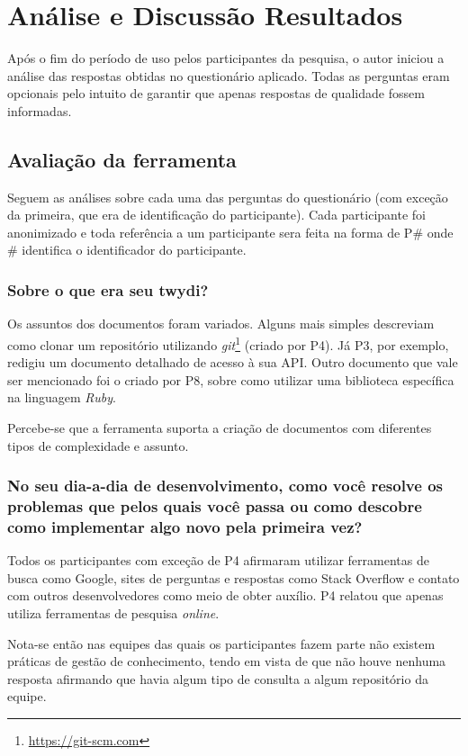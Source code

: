 \chapter{Análise e Discussão Resultados}

Após o fim do período de uso pelos participantes da pesquisa, o autor iniciou a análise das respostas obtidas no questionário aplicado. Todas as perguntas eram opcionais pelo intuito de garantir que apenas respostas de qualidade fossem informadas.

\section{Avaliação da ferramenta}

Seguem as análises sobre cada uma das perguntas do questionário (com exceção da primeira, que era de identificação do participante). Cada participante foi anonimizado e toda referência a um participante sera feita na forma de P\# onde \# identifica o identificador do participante.

\subsection{Sobre o que era seu twydi?}

Os assuntos dos documentos foram variados. Alguns mais simples descreviam como clonar um repositório utilizando \textit{git}\footnote{\url{https://git-scm.com}} (criado por P4). Já P3, por exemplo, redigiu um documento detalhado de acesso à sua API. Outro documento que vale ser mencionado foi o criado por P8, sobre como utilizar uma biblioteca específica na linguagem \textit{Ruby}.

Percebe-se que a ferramenta suporta a criação de documentos com diferentes tipos de complexidade e assunto.

\subsection{No seu dia-a-dia de desenvolvimento, como você resolve os problemas que pelos quais você passa ou como descobre como implementar algo novo pela primeira vez?}

Todos os participantes com exceção de P4 afirmaram utilizar ferramentas de busca como Google, sites de perguntas e respostas como Stack Overflow e contato com outros desenvolvedores como meio de obter auxílio. P4 relatou que apenas utiliza ferramentas de pesquisa \textit{online}.

Nota-se então nas equipes das quais os participantes fazem parte não existem práticas de gestão de conhecimento, tendo em vista de que não houve nenhuma resposta afirmando que havia algum tipo de consulta a algum repositório da equipe.

